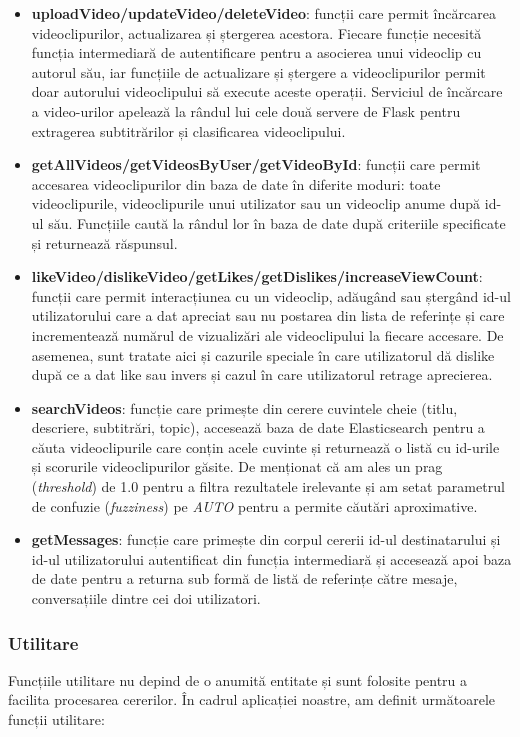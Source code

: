 \begin{itemize}
    \item \textbf{uploadVideo/updateVideo/deleteVideo}: funcții care permit încărcarea videoclipurilor,
    actualizarea și ștergerea acestora. Fiecare funcție necesită funcția intermediară de autentificare pentru
    a asocierea unui videoclip cu autorul său, iar funcțiile de actualizare și ștergere a videoclipurilor
    permit doar autorului videoclipului să execute aceste operații. Serviciul de încărcare a video-urilor
    apelează la rândul lui cele două servere de Flask pentru extragerea subtitrărilor și clasificarea
    videoclipului.
    \item \textbf{getAllVideos/getVideosByUser/getVideoById}: funcții care permit accesarea videoclipurilor
    din baza de date în diferite moduri: toate videoclipurile, videoclipurile unui utilizator sau un
    videoclip anume după id-ul său. Funcțiile caută la rândul lor în baza de date după criteriile
    specificate și returnează răspunsul.
    \item \textbf{likeVideo/dislikeVideo/getLikes/getDislikes/increaseViewCount}: funcții care permit
    interacțiunea cu un videoclip, adăugând sau ștergând id-ul utilizatorului care a dat apreciat sau nu
    postarea din lista de referințe și care incrementează numărul de vizualizări ale videoclipului la
    fiecare accesare. De asemenea, sunt tratate aici și cazurile speciale în care utilizatorul
    dă dislike după ce a dat like sau invers și cazul în care utilizatorul retrage aprecierea.
    \item \textbf{searchVideos}: funcție care primește din cerere cuvintele cheie (titlu, descriere,
    subtitrări, topic), accesează baza de date Elasticsearch pentru a căuta videoclipurile care conțin
    acele cuvinte și returnează o listă cu id-urile și scorurile videoclipurilor găsite. De menționat
    că am ales un prag (\textit{threshold}) de 1.0 pentru a filtra rezultatele irelevante și am setat
    parametrul de confuzie (\textit{fuzziness}) pe \textit{AUTO} pentru a permite căutări aproximative.
    \item \textbf{getMessages}: funcție care primește din corpul cererii id-ul destinatarului și id-ul
    utilizatorului autentificat din funcția intermediară și accesează apoi baza de date pentru a returna
    sub formă de listă de referințe către mesaje, conversațiile dintre cei doi utilizatori.
\end{itemize}

\subsubsection{Utilitare}
Funcțiile utilitare nu depind de o anumită entitate și sunt folosite pentru a facilita procesarea
cererilor. În cadrul aplicației noastre, am definit următoarele funcții utilitare:

